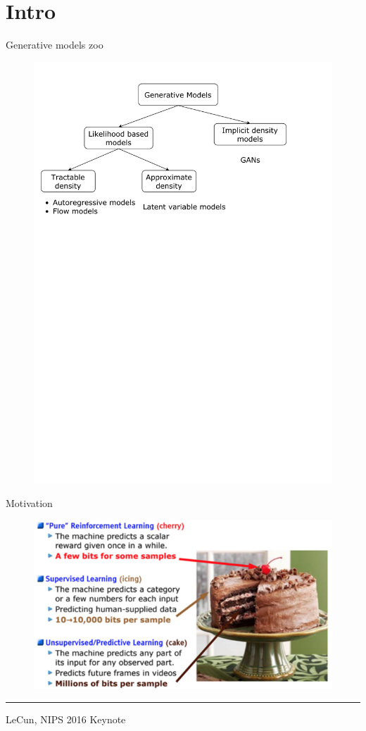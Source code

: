 \section{Intro}
\begin{frame}{Generative models zoo}
    \begin{figure}
        \centering
        \includegraphics[width=1.0\linewidth]{figs/generative_models_zoo.pdf}
        \label{fig:generative_models_zoo}
    \end{figure}
\end{frame}
\begin{frame}{Motivation}
    \begin{figure}
        \centering
        \includegraphics[width=\linewidth]{figs/unsupervised_cake.png}
        \label{fig:unsupervised_cake}
    \end{figure}
\vfill
\hrule\medskip
{\scriptsize LeCun, NIPS 2016 Keynote}
\end{frame}
